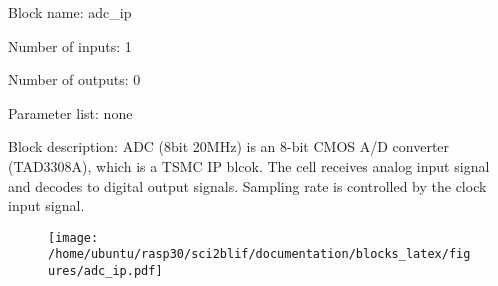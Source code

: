 \pagebreak

Block name: adc\_ip

Number of inputs: 1

Number of outputs: 0

Parameter list: none

Block description: 
ADC (8bit 20MHz) is an 8-bit CMOS A/D converter (TAD3308A), which is a TSMC IP blcok. The cell receives analog input signal and decodes to digital output signals. Sampling rate is controlled by the clock input signal.

\begin{figure}[H]  %
\texttt{[image: /home/ubuntu/rasp30/sci2blif/documentation/blocks\_latex/figures/adc\_ip.pdf]}
\end{figure}

